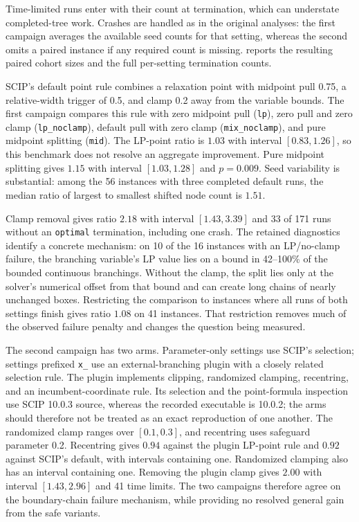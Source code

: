 Time-limited runs enter with their count at termination, which can
understate completed-tree work. Crashes are handled as in the original
analyses: the first campaign averages the available seed counts for that
setting, whereas the second omits a paired instance if any required count
is missing.  reports the resulting paired
cohort sizes and the full per-setting termination counts.



SCIP's default point rule combines a relaxation point with midpoint pull
0.75, a relative-width trigger of 0.5, and clamp 0.2 away from the variable
bounds. The first campaign compares
this rule with zero midpoint pull (\texttt{lp}), zero pull and zero clamp
(\texttt{lp\_noclamp}), default pull with zero clamp
(\texttt{mix\_noclamp}), and pure midpoint splitting (\texttt{mid}).
The LP-point ratio is $1.03$ with interval $[0.83,1.26]$, so this benchmark
does not resolve an aggregate improvement. Pure midpoint splitting gives
$1.15$ with interval $[1.03,1.28]$ and $p=0.009$.
Seed variability is substantial: among the 56 instances with three
completed default runs, the median ratio of largest to smallest shifted
node count is $1.51$.

Clamp removal gives ratio $2.18$ with interval $[1.43,3.39]$ and 33 of
171 runs without an \texttt{optimal} termination, including one crash.
The retained diagnostics identify a concrete mechanism: on 10 of the
16 instances with an LP/no-clamp failure, the branching variable's LP
value lies on a bound in 42--100\% of the bounded continuous branchings.
Without the clamp, the split lies only at the solver's numerical offset
from that bound and can create long chains of nearly unchanged boxes.
Restricting the comparison to instances where all runs of both settings
finish gives ratio $1.08$ on 41 instances. That restriction removes much
of the observed failure penalty and changes the question being measured.

The second campaign has two arms. Parameter-only settings use SCIP's
selection; settings prefixed \texttt{x\_} use an external-branching plugin
with a closely related selection rule. The plugin implements clipping,
randomized clamping, recentring, and an incumbent-coordinate rule.
Its selection and the point-formula inspection use SCIP 10.0.3 source,
whereas the recorded executable is 10.0.2; the arms should therefore not
be treated as an exact reproduction of one another.
The randomized clamp ranges over $[0.1,0.3]$, and recentring uses
safeguard parameter 0.2.
Recentring gives $0.94$ against the plugin LP-point rule and $0.92$ against
SCIP's default, with intervals containing one. Randomized clamping also
has an interval containing one. Removing the plugin clamp gives $2.00$
with interval $[1.43,2.96]$ and 41 time limits. The two campaigns therefore
agree on the boundary-chain failure mechanism, while providing no
resolved general gain from the safe variants.


